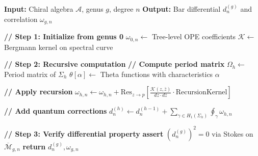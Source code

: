 \begin{algorithm}\label{alg:compute-complete}
\begin{algorithmic}
\STATE \textbf{Input:} Chiral algebra $\mathcal{A}$, genus $g$, degree $n$
\STATE \textbf{Output:} Bar differential $d^{(g)}_n$ and correlation $\omega_{g,n}$

\STATE \textbf{// Step 1: Initialize from genus 0}
\STATE $\omega_{0,n} \gets$ Tree-level OPE coefficients
\STATE $\mathcal{K} \gets$ Bergmann kernel on spectral curve

\STATE \textbf{// Step 2: Recursive computation}
    \STATE \textbf{// Compute period matrix}
    \STATE $\Omega_h \gets$ Period matrix of $\Sigma_h$
    \STATE $\theta[\alpha] \gets$ Theta functions with characteristics $\alpha$
    
    \STATE \textbf{// Apply recursion}
        \STATE $\omega_{h,n} \gets \omega_{h,n} + \text{Res}_{z \to p}\left[\frac{\mathcal{K}(z,\bar{z})}{dz \cdot d\bar{z}} \cdot \text{RecursionKernel}\right]$
    \ENDFOR
    
    \STATE \textbf{// Add quantum corrections}
    \STATE $d^{(h)}_n \gets d^{(h-1)}_n + \sum_{\gamma \in H_1(\Sigma_h)} \oint_\gamma \omega_{h,n}$
\ENDFOR

\STATE \textbf{// Step 3: Verify differential property}
\STATE \textbf{assert} $(d^{(g)}_n)^2 = 0$ via Stokes on $\overline{\mathcal{M}}_{g,n}$
\STATE \textbf{return} $d^{(g)}_n, \omega_{g,n}$
\end{algorithmic}
\end{algorithm}

